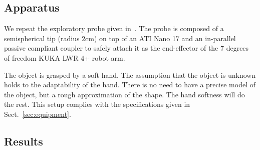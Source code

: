 \subsection{Apparatus}
\label{sec:apparatus}

We repeat the exploratory probe given in~\citet{Rosales2014Active}. The probe is composed of a semispherical tip (radius $2$cm) on top of an ATI Nano 17 and an in-parallel passive compliant coupler to safely attach it as the end-effector of the 7 degrees of freedom KUKA LWR 4+ robot arm.

The object is grasped by a soft-hand. The 
assumption that the object is unknown holds to the adaptability of the hand.
There is no need to have a precise model of the object, but a rough 
approximation of the shape. The hand softness will do the rest. This setup
complies with the specifications given in Sect.~\ref{sec:equipment}.

\subsection{Results}
\label{sec:results}

